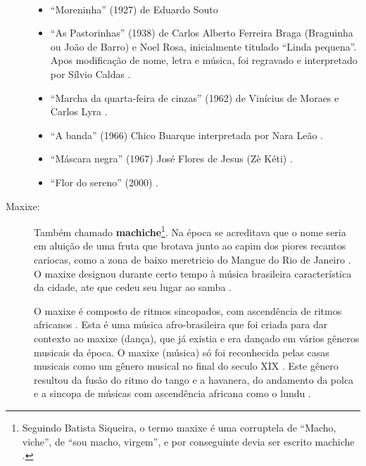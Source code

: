 \begin{description}
\begin{example} ~

\begin{itemize}
\item ``Moreninha'' (1927) de Eduardo Souto \cite[pp. 448]{marcondes1977enciclopedia}
\item ``As Pastorinhas'' (1938) de Carlos Alberto Ferreira Braga (Braguinha ou João de Barro) e Noel Rosa, 
inicialmente titulado ``Linda pequena''.
Apos modificação de nome, letra e música, 
foi regravado e interpretado por Sílvio Caldas \cite[pp. 1066]{marcondes1977enciclopediav2} \cite[pp. 87]{diniz2008almanaque}.
\item ``Marcha da quarta-feira de cinzas'' (1962) de Vinícius de Moraes e Carlos Lyra \cite[pp. 1021]{marcondes1977enciclopediav2} \cite[pp. 91]{diniz2008almanaque}.
\item ``A banda'' (1966) Chico Buarque interpretada por Nara Leão \cite[pp. 90]{diniz2008almanaque}.
\item ``Máscara negra'' (1967) José Flores de Jesus (Zè Kéti)  \cite[pp. 89]{diniz2008almanaque}.
\item ``Flor do sereno'' (2000)  \cite[pp. 88]{diniz2008almanaque}.

\end{itemize}
\end{example}

\item[Maxixe:] 
Também chamado \textbf{machiche}\footnote{Seguindo Batista Siqueira, 
o termo maxixe é uma corruptela de ``Macho, viche'', 
de ``sou macho, virgem'', e por conseguinte devia ser escrito machiche \cite[pp. 198]{dourado2004dicionario}.}.
Na época se acreditava que o nome seria em aluição de uma fruta que brotava junto ao capim dos piores recantos cariocas,
como a zona de baixo meretricio do Mangue do Rio de Janeiro \cite[pp. 198]{dourado2004dicionario}.
O maxixe designou durante certo tempo à música brasileira característica da cidade, 
ate que cedeu seu lugar ao samba \cite[pp. 4]{musicasambavariasdef1}.

O maxixe é composto de ritmos sincopados, com ascendência de ritmos africanos \cite[pp. 198]{dourado2004dicionario}.
Esta é uma música afro-brasileira \cite[pp. 4]{musicasambavariasdef1} 
que foi criada para dar contexto ao  maxixe (dança), que já existia e era dançado em vários gêneros musicais da época.
O maxixe (música) só foi reconhecida pelas casas musicais como um gênero musical no final do seculo XIX \cite[pp. 465]{marcondes1977enciclopedia}. 
Este gênero resultou da fusão do ritmo do tango e a havanera, 
do andamento da polca e a sincopa de músicas com ascendência africana como o lundu  \cite[pp. 29]{efege1974maxixe}  \cite[pp. 465]{marcondes1977enciclopedia}. 


\end{description}
